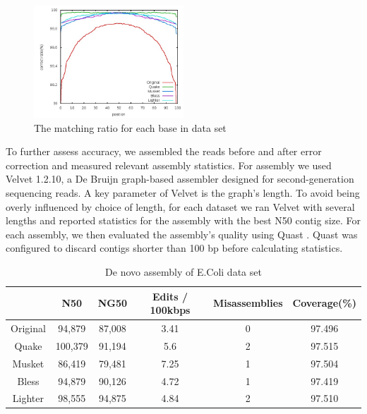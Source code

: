 \documentclass[10pt]{article}
\begin{document}

\begin{figure}[h!]
\begin{center}
\includegraphics[width=0.5\textwidth]{per_base.jpg}
\caption{The matching ratio for each base in \ecoli data set\label{fig:ecoli_perbase}}
\end{center}
\end{figure}

To further assess accuracy, we assembled the reads before and after error correction and measured relevant assembly statistics.  For assembly we used Velvet 1.2.10\cite{zerbino2008velvet}, a De Bruijn graph-based assembler designed for second-generation sequencing reads.  A key parameter of Velvet is the graph's \kmer length.  To avoid being overly influenced by choice of \kmer length, for each dataset we ran Velvet with several \kmer lengths and reported statistics for the assembly with the best N50 contig size.  For each assembly, we then evaluated the assembly's quality using Quast \cite{gurevich2013quast}.  Quast was configured to discard contigs shorter than 100 bp before calculating statistics.

\begin{table}
\centering
\begin{tabular}{|c|c|c|c|c|c|} \hline
	 	& N50 &	NG50	 & Edits / 100kbps&	Misassemblies	& Coverage(\%) \\ \hline
Original &	94,879 &	87,008	& 3.41	& 0	& 97.496  \\ \hline
Quake	& 100,379 &	91,194	& 5.6	& 2	 & 97.515  \\ \hline
Musket	& 86,419  &	79,481	& 7.25	& 1	 & 97.504  \\ \hline
Bless	& 94,879  &	90,126	& 4.72	& 1	& 97.419  \\ \hline
Lighter	& 98,555  &	94,875	& 4.84	& 2	& 97.510  \\ \hline

\end{tabular}
\caption{De novo assembly of E.Coli data set\label{table:ecoli_assembly}}
\end{table}
\end{document}

